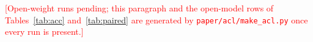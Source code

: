 \textcolor{red}{[Open-weight runs pending; this paragraph and the open-model rows of Tables~\ref{tab:acc} and~\ref{tab:paired} are generated by \texttt{paper/acl/make\_acl.py} once every run is present.]}
